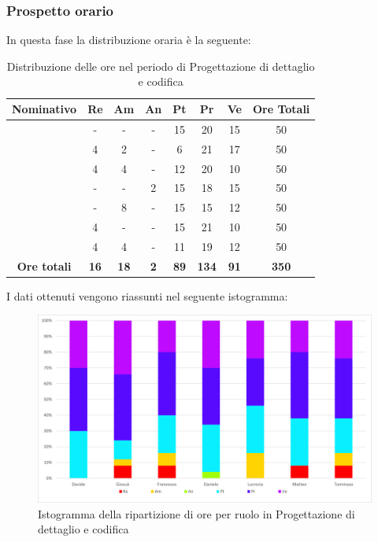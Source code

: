 \subsubsection{Prospetto orario}
In questa fase la distribuzione oraria è la seguente:
\begin{table}[H]
		\begin{center}
			\setlength{\aboverulesep}{0pt}
			\setlength{\belowrulesep}{0pt}
			\setlength{\extrarowheight}{.75ex}
			\begin{tabular}{ c c c c c c c c }
				\rowcolor{AzzurroGruppo!30} 
				\textbf{Nominativo} & \textbf{Re} & \textbf{Am} & \textbf{An} & \textbf{Pt} & \textbf{Pr} & \textbf{Ve} & \textbf{Ore Totali}  \\
				\toprule
				\Davide    & - & - & - & 15 & 20 & 15 & 50 \\
				\Giosue    & 4 & 2 & - & 6 & 21 & 17 & 50 \\
				\Francesco & 4 & 4 & - & 12 & 20 & 10 & 50 \\
				\Daniele   & - & - & 2 & 15 & 18 & 15 & 50 \\
				\Lucrezia  & - & 8 & - & 15 & 15 & 12 & 50 \\
				\Matteo    & 4 & - & - & 15 & 21 & 10 & 50 \\
				\Tommaso   & 4 & 4 & - & 11 & 19 & 12 & 50 \\
				 \textbf{Ore totali} & \textbf{16} & \textbf{18} & \textbf{2} & \textbf{89} & \textbf{134} & \textbf{91} & \textbf{350} \\
				\bottomrule
			\end{tabular}
			\caption{Distribuzione delle ore nel periodo di Progettazione di dettaglio e codifica}
		\end{center}
	\end{table}
	I dati ottenuti vengono riassunti nel seguente istogramma:
\begin{figure}[H]
    \centering
    \includegraphics[scale = 0.5]{components/img/Sprint-8-9-isto.png}
    \caption{Istogramma della ripartizione di ore per ruolo in Progettazione di dettaglio e codifica}
    \label{fig:istogramma ripartizione ore , fase di Progettazione di dettaglio e codifica}
\end{figure}
